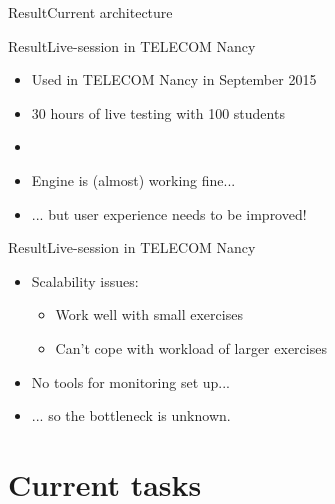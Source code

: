 \documentclass{beamer}
\begin{document}
\begin{frame}{Result}{Current architecture}
\begin{center}
  \end{center}
\end{frame}

\begin{frame}{Result}{Live-session in TELECOM Nancy}
  \begin{itemize}
  \item {
    Used in TELECOM Nancy in September 2015
  }
  \item {
    30 hours of live testing with 100 students
    \pause
  }
  \item[~]
  \item {
    Engine is (almost) working fine...
  }
  \item {
    ... but user experience needs to be improved!
  }
  \end{itemize}
\end{frame}


\begin{frame}{Result}{Live-session in TELECOM Nancy}
  \begin{itemize}
  \item {
    Scalability issues:
    \begin{itemize}
    \item Work well with small exercises
    \item Can't cope with workload of larger exercises
    \end{itemize}
    \pause
  }
  \item {
    No tools for monitoring set up...
    \pause
  }
  \item {
    ... so the bottleneck is unknown.
  }
  \end{itemize}
\end{frame}

\section{Current tasks}
\end{document}
